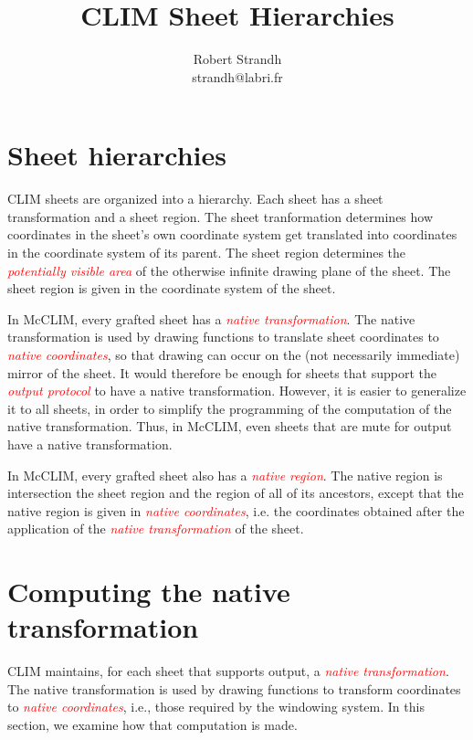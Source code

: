 \documentclass{article}
\title{CLIM Sheet Hierarchies}
\author{Robert Strandh \\ strandh@labri.fr}
\newcommand{\gloss}[1]{\textsl{\textcolor{red}{#1}}}
\begin{document}
\maketitle

{\setlength{\parskip}{0cm}
\tableofcontents}

\section{Sheet hierarchies}

CLIM sheets are organized into a hierarchy.  Each sheet has a sheet
transformation and a sheet region.  The sheet tranformation determines
how coordinates in the sheet's own coordinate system get translated
into coordinates in the coordinate system of its parent.  The sheet
region determines the \gloss{potentially visible area} of the
otherwise infinite drawing plane of the sheet.  The sheet region is
given in the coordinate system of the sheet. 

In McCLIM, every grafted sheet has a \gloss{native transformation}.
The native transformation is used by drawing functions to translate
sheet coordinates to \gloss{native coordinates}, so that drawing can
occur on the (not necessarily immediate) mirror of the sheet.  It
would therefore be enough for sheets that support the \gloss{output
protocol} to have a native transformation.  However, it is easier to
generalize it to all sheets, in order to simplify the programming of
the computation of the native transformation.  Thus, in McCLIM, even
sheets that are mute for output have a native transformation.

In McCLIM, every grafted sheet also has a \gloss{native region}.  The
native region is intersection the sheet region and the region of all
of its ancestors, except that the native region is given in
\gloss{native coordinates}, i.e. the coordinates obtained after the
application of the \gloss{native transformation} of the sheet.

\section{Computing the native transformation}

CLIM maintains, for each sheet that supports output, a \gloss{native
transformation}.  The native transformation is used by drawing
functions to transform coordinates to \gloss{native coordinates},
i.e., those required by the windowing system.  In this section, we
examine how that computation is made.
\end{document}
